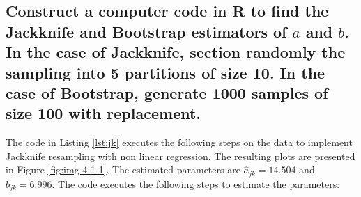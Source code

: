 \documentclass[]{article}
\begin{document}
\subsection{Construct a computer code in R to find the Jackknife and Bootstrap estimators of $a$ and $b$. In the 
	case of Jackknife, section randomly the sampling into 5 partitions of size 10. In the case of 
	Bootstrap, generate 1000 samples of size 100 with replacement. }



The code in Listing \ref{lst:jk} executes the following steps on the data to implement Jackknife resampling with non linear regression. The resulting plots are presented in Figure \ref{fig:img-4-1-1}. The estimated parameters are $\hat{a}_{jk} = 14.504$ and $\hat{b}_{jk} = 6.996$. The code executes the following steps to estimate the parameters:
\end{document}
